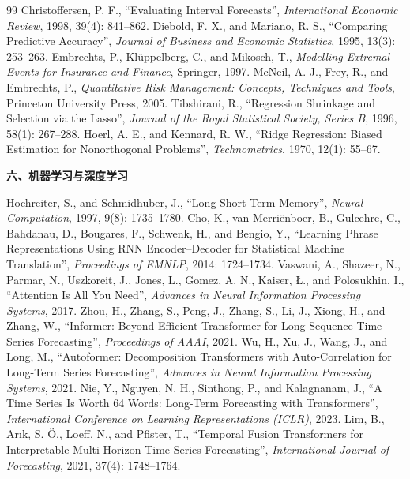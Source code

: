 \begin{thebibliography}{99}
 Christoffersen, P. F., ``Evaluating Interval Forecasts'', \emph{International Economic Review}, 1998, 39(4): 841--862.
 Diebold, F. X., and Mariano, R. S., ``Comparing Predictive Accuracy'', \emph{Journal of Business and Economic Statistics}, 1995, 13(3): 253--263.
 Embrechts, P., Kl\"uppelberg, C., and Mikosch, T., \emph{Modelling Extremal Events for Insurance and Finance}, Springer, 1997.
 McNeil, A. J., Frey, R., and Embrechts, P., \emph{Quantitative Risk Management: Concepts, Techniques and Tools}, Princeton University Press, 2005.
 Tibshirani, R., ``Regression Shrinkage and Selection via the Lasso'', \emph{Journal of the Royal Statistical Society, Series B}, 1996, 58(1): 267--288.
 Hoerl, A. E., and Kennard, R. W., ``Ridge Regression: Biased Estimation for Nonorthogonal Problems'', \emph{Technometrics}, 1970, 12(1): 55--67.

\item[] \textbf{六、机器学习与深度学习}

 Hochreiter, S., and Schmidhuber, J., ``Long Short-Term Memory'', \emph{Neural Computation}, 1997, 9(8): 1735--1780.
 Cho, K., van Merri\"enboer, B., Gulcehre, C., Bahdanau, D., Bougares, F., Schwenk, H., and Bengio, Y., ``Learning Phrase Representations Using RNN Encoder--Decoder for Statistical Machine Translation'', \emph{Proceedings of EMNLP}, 2014: 1724--1734.
 Vaswani, A., Shazeer, N., Parmar, N., Uszkoreit, J., Jones, L., Gomez, A. N., Kaiser, \L., and Polosukhin, I., ``Attention Is All You Need'', \emph{Advances in Neural Information Processing Systems}, 2017.
 Zhou, H., Zhang, S., Peng, J., Zhang, S., Li, J., Xiong, H., and Zhang, W., ``Informer: Beyond Efficient Transformer for Long Sequence Time-Series Forecasting'', \emph{Proceedings of AAAI}, 2021.
 Wu, H., Xu, J., Wang, J., and Long, M., ``Autoformer: Decomposition Transformers with Auto-Correlation for Long-Term Series Forecasting'', \emph{Advances in Neural Information Processing Systems}, 2021.
 Nie, Y., Nguyen, N. H., Sinthong, P., and Kalagnanam, J., ``A Time Series Is Worth 64 Words: Long-Term Forecasting with Transformers'', \emph{International Conference on Learning Representations (ICLR)}, 2023.
 Lim, B., Ar\i k, S. \"O., Loeff, N., and Pfister, T., ``Temporal Fusion Transformers for Interpretable Multi-Horizon Time Series Forecasting'', \emph{International Journal of Forecasting}, 2021, 37(4): 1748--1764.


\end{thebibliography}
